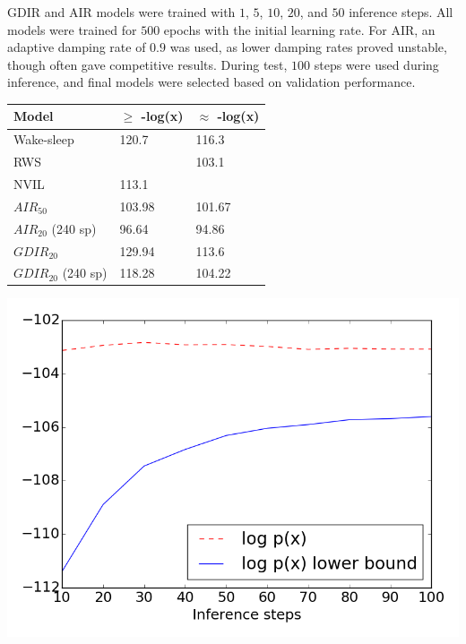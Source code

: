 \documentclass{article} %
\begin{document}
GDIR and AIR models were trained with $1$, $5$, $10$, $20$, and $50$ inference steps. All
models were trained for $500$ epochs with the initial learning rate. For AIR, an
adaptive damping rate of $0.9$ was used, as lower damping rates proved unstable, though often gave competitive results.
During test, $100$ steps were used during inference, and final models were selected
based on validation performance.

\begin{minipage}{\textwidth}
    \begin{minipage}[l]{0.5\textwidth}

\begin{tabular}{ | m{8em} | m{1.4cm}| m{1.4cm} | } 
\hline
Model & $\ge$ -log(x) & $\approx$ -log(x) \\ 
\hline
\hline
Wake-sleep & 120.7 & 116.3 \\ 
RWS & & 103.1 \\
\hline
NVIL & 113.1 &  \\ 
\hline
$AIR_{50}$ & 103.98 & 101.67 \\
$AIR_{20}$ (240 sp) & 96.64 & 94.86 \\
\hline
$GDIR_{20}$ & 129.94 & 113.6 \\
$GDIR_{20}$ (240 sp) & 118.28  & 104.22 \\
\hline
\end{tabular}
\label{table:binary}

\end{minipage}
    \hspace{0.1\textwidth}
    \begin{minipage}[r]{0.4\textwidth}

\includegraphics[scale=0.3]{figures/binary_eval}
\label{fig:binary}
        \end{minipage}
\end{minipage}
\end{document}
